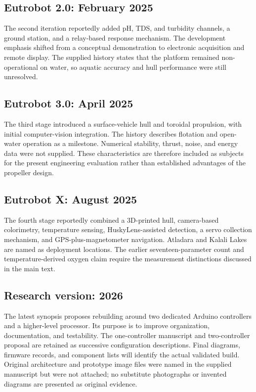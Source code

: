 \documentclass[12pt,a4paper]{article}
\begin{document}
\subsection{Eutrobot 2.0: February 2025}
The second iteration reportedly added pH, TDS, and turbidity channels, a ground station, and a relay-based response mechanism. The development emphasis shifted from a conceptual demonstration to electronic acquisition and remote display. The supplied history states that the platform remained non-operational on water, so aquatic accuracy and hull performance were still unresolved.

\subsection{Eutrobot 3.0: April 2025}
The third stage introduced a surface-vehicle hull and toroidal propulsion, with initial computer-vision integration. The history describes flotation and open-water operation as a milestone. Numerical stability, thrust, noise, and energy data were not supplied. These characteristics are therefore included as subjects for the present engineering evaluation rather than established advantages of the propeller design.

\subsection{Eutrobot X: August 2025}
The fourth stage reportedly combined a 3D-printed hull, camera-based colorimetry, temperature sensing, HuskyLens-assisted detection, a servo collection mechanism, and GPS-plus-magnetometer navigation. Atladara and Kalali Lakes are named as deployment locations. The earlier seventeen-parameter count and temperature-derived oxygen claim require the measurement distinctions discussed in the main text.

\subsection{Research version: 2026}
The latest synopsis proposes rebuilding around two dedicated Arduino controllers and a higher-level processor. Its purpose is to improve organization, documentation, and testability. The one-controller manuscript and two-controller proposal are retained as successive configuration descriptions. Final diagrams, firmware records, and component lists will identify the actual validated build. Original architecture and prototype image files were named in the supplied manuscript but were not attached; no substitute photographs or invented diagrams are presented as original evidence.
\end{document}

